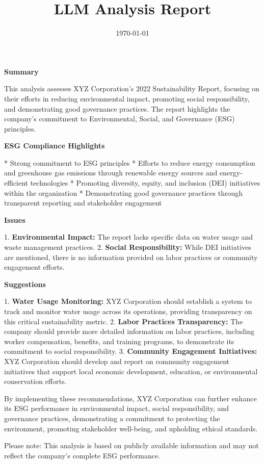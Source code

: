 \documentclass{article}
\title{LLM Analysis Report}
\date{\today}
\begin{document}
                \maketitle

                \textbf{Summary}

This analysis assesses XYZ Corporation's 2022 Sustainability Report, focusing on their efforts in reducing environmental impact, promoting social responsibility, and demonstrating good governance practices. The report highlights the company's commitment to Environmental, Social, and Governance (ESG) principles.

\textbf{ESG Compliance Highlights}

* Strong commitment to ESG principles
* Efforts to reduce energy consumption and greenhouse gas emissions through renewable energy sources and energy-efficient technologies
* Promoting diversity, equity, and inclusion (DEI) initiatives within the organization
* Demonstrating good governance practices through transparent reporting and stakeholder engagement

\textbf{Issues}

1. \textbf{Environmental Impact:} The report lacks specific data on water usage and waste management practices.
2. \textbf{Social Responsibility:} While DEI initiatives are mentioned, there is no information provided on labor practices or community engagement efforts.

\textbf{Suggestions}

1. \textbf{Water Usage Monitoring:} XYZ Corporation should establish a system to track and monitor water usage across its operations, providing transparency on this critical sustainability metric.
2. \textbf{Labor Practices Transparency:} The company should provide more detailed information on labor practices, including worker compensation, benefits, and training programs, to demonstrate its commitment to social responsibility.
3. \textbf{Community Engagement Initiatives:} XYZ Corporation should develop and report on community engagement initiatives that support local economic development, education, or environmental conservation efforts.

By implementing these recommendations, XYZ Corporation can further enhance its ESG performance in environmental impact, social responsibility, and governance practices, demonstrating a commitment to protecting the environment, promoting stakeholder well-being, and upholding ethical standards.

Please note: This analysis is based on publicly available information and may not reflect the company's complete ESG performance.

                
\end{document}
